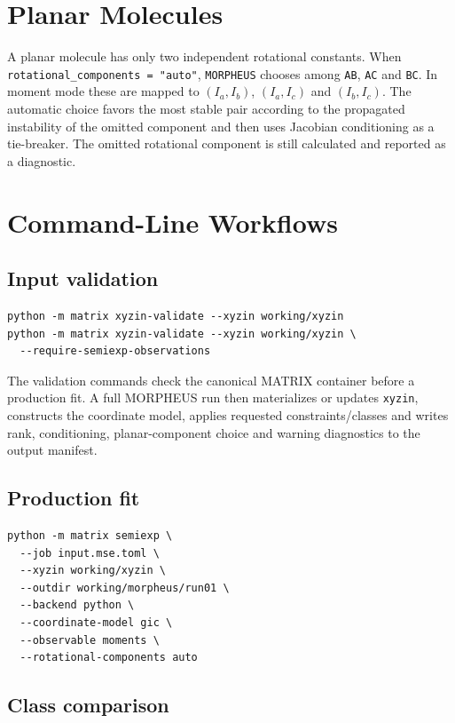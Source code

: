 \documentclass[11pt]{article}
\newcommand{\program}{\texttt{MORPHEUS}}
\newcommand{\xyzin}{\texttt{xyzin}}
\begin{document}
\section{Planar Molecules}

A planar molecule has only two independent rotational constants.  When
\texttt{rotational\_components = "auto"}, \program{} chooses among
\texttt{AB}, \texttt{AC} and \texttt{BC}.  In moment mode these are mapped to
\((I_a,I_b)\), \((I_a,I_c)\) and \((I_b,I_c)\).  The automatic choice favors
the most stable pair according to the propagated instability of the omitted
component and then uses Jacobian conditioning as a tie-breaker.  The omitted
rotational component is still calculated and reported as a diagnostic.

\section{Command-Line Workflows}

\subsection{Input validation}

\begin{lstlisting}[style=oracle]
python -m matrix xyzin-validate --xyzin working/xyzin
python -m matrix xyzin-validate --xyzin working/xyzin \
  --require-semiexp-observations
\end{lstlisting}

\noindent
The validation commands check the canonical MATRIX container before a
production fit.  A full MORPHEUS run then materializes or updates \xyzin{},
constructs the coordinate model, applies requested constraints/classes and
writes rank, conditioning, planar-component choice and warning diagnostics to
the output manifest.

\subsection{Production fit}

\begin{lstlisting}[style=oracle]
python -m matrix semiexp \
  --job input.mse.toml \
  --xyzin working/xyzin \
  --outdir working/morpheus/run01 \
  --backend python \
  --coordinate-model gic \
  --observable moments \
  --rotational-components auto
\end{lstlisting}

\subsection{Class comparison}
\end{document}
